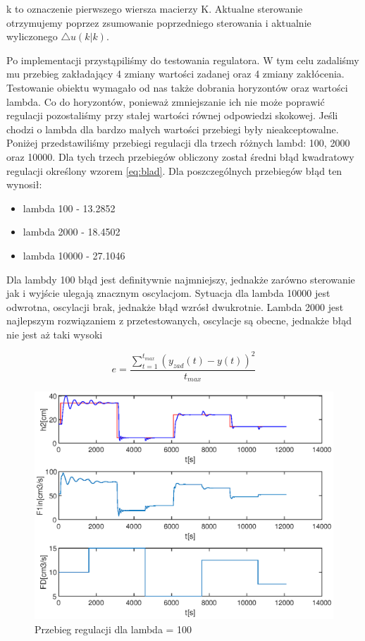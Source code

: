 		k to oznaczenie pierwszego wiersza macierzy K. Aktualne sterowanie otrzymujemy poprzez zsumowanie poprzedniego sterowania i aktualnie wyliczonego $\triangle u(k|k)$. 
		
		Po implementacji przystąpiliśmy do testowania regulatora. W tym celu zadaliśmy mu przebieg zakładający 4 zmiany wartości zadanej oraz 4 zmiany zakłócenia. Testowanie obiektu wymagało od nas także dobrania horyzontów oraz wartości lambda. Co do horyzontów, ponieważ zmniejszanie ich nie może poprawić regulacji pozostaliśmy przy stałej wartości równej odpowiedzi skokowej. Jeśli chodzi o lambda dla bardzo małych wartości przebiegi były nieakceptowalne. Poniżej przedstawiliśmy przebiegi regulacji dla trzech różnych lambd: 100, 2000 oraz 10000. Dla tych trzech przebiegów obliczony został średni błąd kwadratowy regulacji określony wzorem \ref{eq:blad}. Dla poszczególnych przebiegów błąd ten wynosił:
		\begin{itemize}
			\item lambda 100 - 13.2852
			\item lambda 2000 - 18.4502
			\item lambda 10000 - 27.1046
		\end{itemize}
		Dla lambdy 100 błąd jest definitywnie najmniejszy, jednakże zarówno sterowanie jak i wyjście ulegają znacznym oscylacjom. Sytuacja dla lambda 10000 jest odwrotna, oscylacji brak, jednakże błąd wzrósł dwukrotnie. Lambda 2000 jest najlepszym rozwiązaniem z przetestowanych, oscylacje są obecne, jednakże błąd nie jest aż taki wysoki
		
		\begin{equation}
			e = \frac{\sum_{t=1}^{t_{max}}(y_{zad}(t)-y(t))^2}{t_{max}}
			\label{eq:blad}
		\end{equation}
		
		
		\begin{figure}
			\includegraphics[width=0.9\linewidth]{plots/z1_dmc_100.eps}
			\caption{Przebieg regulacji dla lambda = 100}
			\label{rys:dmc100}
		\end{figure}
		
